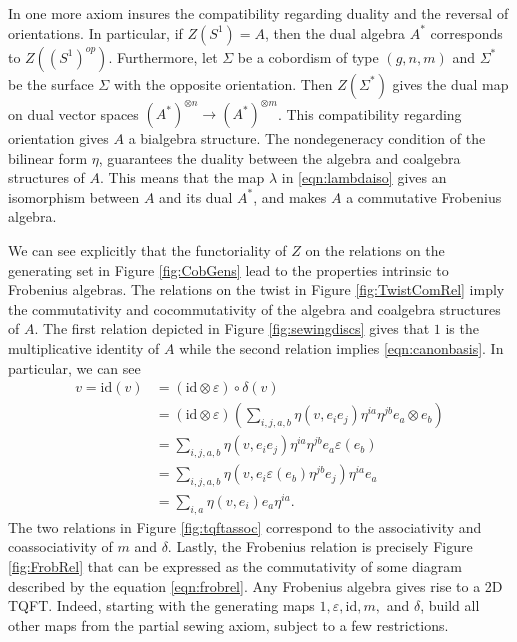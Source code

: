 \documentclass{amsart}
\newcommand{\tensor}{\otimes}
\newcommand{\eps}{\varepsilon}
\newcommand{\id}{\mathrm{id}}
\theoremstyle{definition}
\begin{document}
\noindent In \cite{Atiyah} one more axiom insures the compatibility regarding duality and the reversal of orientations. In particular, if $Z(S^1)=A$, then the dual  algebra $A^*$ corresponds to $Z((S^1)^{op})$. Furthermore, let $\Sigma$ be a cobordism of type $(g,n,m)$ and $\Sigma^*$ be the surface $\Sigma$ with the opposite orientation. Then $Z(\Sigma^*)$ gives the dual map on dual vector spaces $(A^*)^{\tensor n}\longrightarrow (A^*)^{\tensor m}$. This compatibility regarding orientation gives $A$ a bialgebra structure. The nondegeneracy condition of  the bilinear form $\eta$, guarantees the duality between the algebra and coalgebra structures of $A$. This means that the map $\lambda$ in \ref{eqn:lambdaiso} gives an isomorphism between $A$ and its dual $A^*$, and makes $A$ a commutative Frobenius algebra.

\noindent We can see explicitly that the functoriality of $Z$ on the relations on the generating set in Figure \ref{fig:CobGens} lead to the properties intrinsic to Frobenius algebras. The relations on the twist in Figure \ref{fig:TwistComRel} imply the commutativity and cocommutativity of the algebra and coalgebra structures of $A$. The first relation depicted in Figure \ref{fig:sewingdiscs} gives that $1$ is the multiplicative identity of $A$ while the second relation implies \ref{eqn:canonbasis}. In particular, we can see \begin{align*}
    v=\id(v)&=(\id\tensor \eps)\circ \delta(v)\\
    &= (\id\tensor \eps)\left(\sum_{i,j,a,b}\eta(v,e_ie_j)\eta^{ia}\eta^{jb}e_a\tensor e_b\right)\\
    &=\sum_{i,j,a,b}\eta(v,e_ie_j)\eta^{ia}\eta^{jb}e_a \eps(e_b)\\
    &=\sum_{i,j,a,b}\eta(v,e_i\eps(e_b)\eta^{jb}e_j)\eta^{ia}e_a\\
    &=\sum_{i,a}\eta(v,e_i)e_a\eta^{ia} .
\end{align*}
\noindent The two relations in Figure \ref{fig:tqftassoc} correspond to the associativity and coassociativity of $m$ and $\delta$. Lastly, the Frobenius relation is precisely Figure \ref{fig:FrobRel} that can be expressed as the commutativity of some diagram described by the equation \ref{eqn:frobrel}.
Any Frobenius algebra gives rise to a 2D TQFT. Indeed, starting with the generating maps $1,\eps,\id, m, $ and $\delta$, build all other maps from the partial sewing axiom, subject to a few restrictions.
\end{document}
